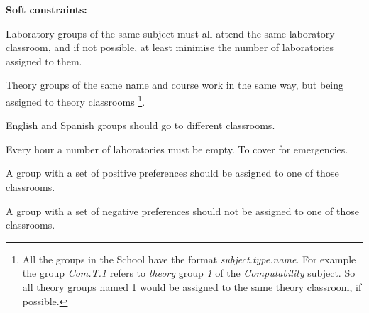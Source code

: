 \textbf{Soft constraints:}

\begin{description}
    \item Laboratory groups of the same subject must all attend the same laboratory classroom, and if not possible, at least minimise the number of laboratories assigned to them.
    \item Theory groups of the same name and course work in the same way, but being assigned to theory classrooms \footnote{All the groups in the School have the format \textit{subject.type.name}. For example the group \textit{Com.T.1} refers to \textit{theory} group \textit{1} of the \textit{Computability} subject. So all theory groups named 1 would be assigned to the same theory classroom, if possible.}.
    \item English and Spanish groups should go to different classrooms.
    \item Every hour a number of laboratories must be empty. To cover for emergencies.
    \item A group with a set of positive preferences should be assigned to one of those classrooms.
    \item A group with a set of negative preferences should not be assigned to one of those classrooms.
\end{description}

